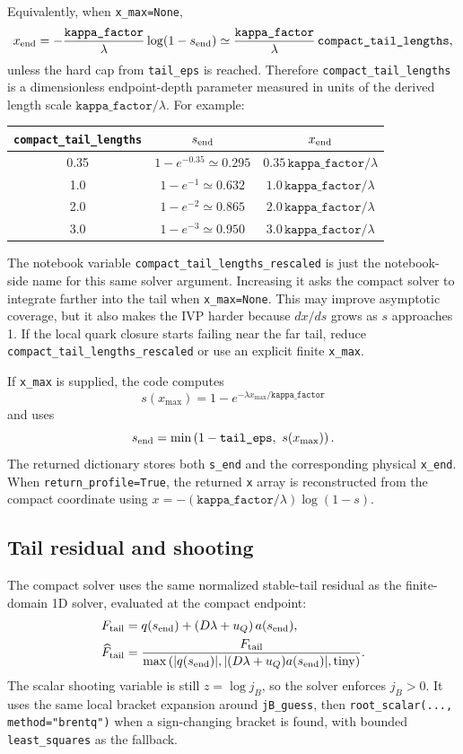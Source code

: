 \documentclass[11pt]{article}
\begin{document}
Equivalently, when \texttt{x\_max=None},
\[
x_{\rm end}
= -\frac{\texttt{kappa\_factor}}{\lambda}\log(1-s_{\rm end})
\simeq \frac{\texttt{kappa\_factor}}{\lambda}\,\texttt{compact\_tail\_lengths},
\]
unless the hard cap from \texttt{tail\_eps} is reached. Therefore
\texttt{compact\_tail\_lengths} is a dimensionless endpoint-depth parameter
measured in units of the derived length scale
$\texttt{kappa\_factor}/\lambda$. For example:
\begin{center}
\begin{tabular}{ccc}
\toprule
\texttt{compact\_tail\_lengths} & $s_{\rm end}$ & $x_{\rm end}$ \\
\midrule
0.35 & $1-e^{-0.35}\simeq 0.295$ & $0.35\,\texttt{kappa\_factor}/\lambda$ \\
1.0  & $1-e^{-1}\simeq 0.632$    & $1.0\,\texttt{kappa\_factor}/\lambda$ \\
2.0  & $1-e^{-2}\simeq 0.865$    & $2.0\,\texttt{kappa\_factor}/\lambda$ \\
3.0  & $1-e^{-3}\simeq 0.950$    & $3.0\,\texttt{kappa\_factor}/\lambda$ \\
\bottomrule
\end{tabular}
\end{center}

The notebook variable \texttt{compact\_tail\_lengths\_rescaled} is just the
notebook-side name for this same solver argument. Increasing it asks the
compact solver to integrate farther into the tail when \texttt{x\_max=None}.
This may improve asymptotic coverage, but it also makes the IVP harder because
$dx/ds$ grows as $s$ approaches 1. If the local quark closure starts failing
near the far tail, reduce \texttt{compact\_tail\_lengths\_rescaled} or use an
explicit finite \texttt{x\_max}.

If \texttt{x\_max} is supplied, the code computes
\[
s(x_{\max}) = 1 - e^{-\lambda x_{\max}/\texttt{kappa\_factor}}
\]
and uses
\[
s_{\rm end} =
\min\left(1-\texttt{tail\_eps},\ s(x_{\max})\right).
\]
The returned dictionary stores both \texttt{s\_end} and the corresponding
physical \texttt{x\_end}. When \texttt{return\_profile=True}, the returned
\texttt{x} array is reconstructed from the compact coordinate using
$x=-(\texttt{kappa\_factor}/\lambda)\log(1-s)$.

\subsection{Tail residual and shooting}
The compact solver uses the same normalized stable-tail residual as the
finite-domain 1D solver, evaluated at the compact endpoint:
\begin{align}
F_{\rm tail}
&= q(s_{\rm end})
 + \left(D\lambda+u_Q\right)a(s_{\rm end}),\\
\widehat F_{\rm tail}
&=
\frac{F_{\rm tail}}
{\max\left(|q(s_{\rm end})|,
|(D\lambda+u_Q)a(s_{\rm end})|,
{\rm tiny}\right)}.
\end{align}
The scalar shooting variable is still $z=\log j_B$, so the solver enforces
$j_B>0$. It uses the same local bracket expansion around \texttt{jB\_guess},
then \texttt{root\_scalar(..., method="brentq")} when a sign-changing bracket
is found, with bounded \texttt{least\_squares} as the fallback.
\end{document}
